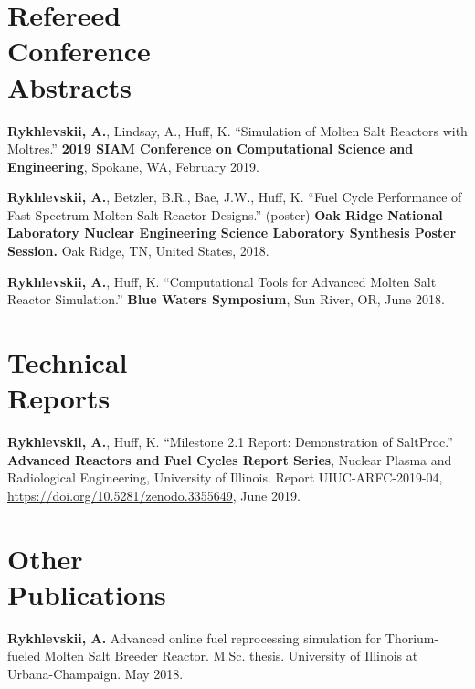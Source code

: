 \documentclass[margin,line]{resume}
\begin{document}
\begin{resume}
    \section{\mysidestyle Refereed\\Conference\\Abstracts}
    \begin{bibenum} 
    \item \textbf{Rykhlevskii, A.}, Lindsay, A., Huff, K. ``Simulation of Molten Salt Reactors with Moltres.'' \textbf{2019 SIAM Conference on Computational Science and Engineering}, 
            Spokane, WA, February 2019.
	\item \textbf{Rykhlevskii, A.}, Betzler, B.R., Bae, J.W., Huff, K. ``Fuel Cycle Performance of Fast Spectrum Molten Salt Reactor Designs.'' (poster)
            \textbf{Oak Ridge National Laboratory Nuclear Engineering Science Laboratory Synthesis Poster Session.} 
            Oak Ridge, TN, United States, 2018.
    \item \textbf{Rykhlevskii, A.}, Huff, K. ``Computational Tools for Advanced 
            Molten Salt Reactor Simulation.'' \textbf{Blue Waters Symposium}, 
            Sun River, OR, June 2018.
	\end{bibenum}
\section{\mysidestyle Technical\\Reports}
\begin{bibenum} 
	\item \textbf{Rykhlevskii, A.}, Huff, K. ``Milestone 2.1 Report: 
	Demonstration of 
	SaltProc.'' \textbf{Advanced Reactors and Fuel Cycles Report Series}, 
	Nuclear Plasma and Radiological Engineering, University of Illinois.  
	Report UIUC-ARFC-2019-04, \url{https://doi.org/10.5281/zenodo.3355649}, 
	June 2019.  
\end{bibenum}
\section{\mysidestyle Other\\Publications}
\begin{bibenum}
	\item \textbf{Rykhlevskii, A.} Advanced  online fuel reprocessing 
	simulation for Thorium-fueled Molten Salt Breeder Reactor.
	M.Sc. thesis. University of Illinois at Urbana-Champaign.  May 2018.
\end{bibenum}

\end{resume}
\end{document}
